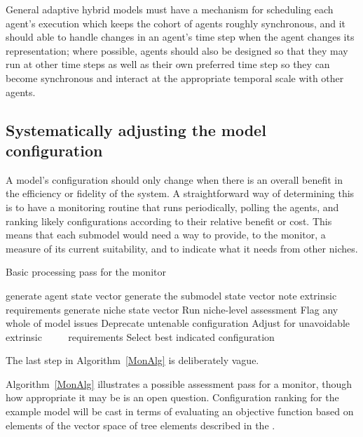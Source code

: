 General adaptive hybrid models must have a mechanism for scheduling
each agent's execution which keeps the cohort of agents roughly
synchronous, and it should able to handle changes in an agent's time
step when the agent changes its rep\-re\-sen\-ta\-tion; where possible, agents
should also be designed so that they may run at other time steps as
well as their own preferred time step so they can become synchronous
and interact at the appropriate temporal scale with other agents.


\subsection{Systematically adjusting the model con\-fig\-ur\-a\-tion}

A model's con\-fig\-ur\-a\-tion should only change when there is an overall
benefit in the efficiency or fidelity of the system.  A
straightforward way of determining this is to have a monitoring
routine that runs periodically, polling the agents, and ranking likely
con\-fig\-ur\-a\-tions according to their relative benefit or cost.  This
means that each sub\-model would need a way to provide, to the monitor,
a measure of its current suitability, and to indicate what it needs
from other niches. 


\begin{algorithm}\label{MonAlg}
  \caption{Basic processing pass for the monitor}
  \begin{algorithmic}
    \State generate agent state vector
    \State generate the sub\-model state vector
    \State \qquad note extrinsic requirements
    \EndFor
    \EndFor
    \State
    \State generate niche state vector
    \EndFor
    \State
    \State Run niche-level assessment
    \State Flag any whole of model issues
    \State Deprecate untenable con\-fig\-ur\-a\-tion
    \State Adjust for unavoidable extrinsic
    \State $\qquad$ requirements
    \EndFor
    \State
    \State Select best indicated con\-fig\-ur\-a\-tion
  \end{algorithmic}
\end{algorithm} The last step in Algorithm~\ref{MonAlg} is deliberately vague. 

Algorithm~\ref{MonAlg} illustrates a possible
assessment pass for a monitor, though how appropriate it may be is an
open question. Configuration ranking for the example model will be
cast in terms of evaluating an objective function based on elements of
the vector space of tree elements described in the \appendixname.

